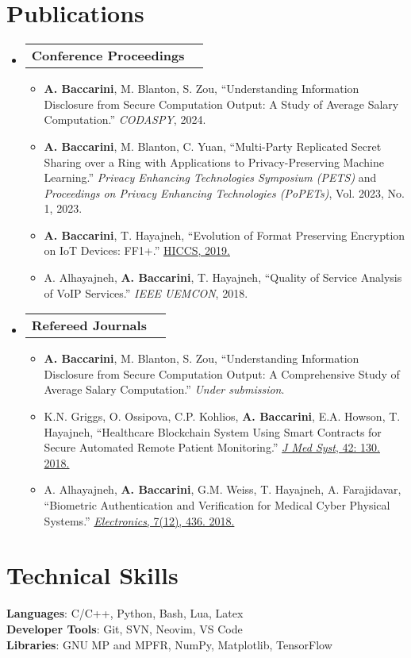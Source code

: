 \documentclass[letterpaper,11pt]{article}
\makeatletter
\newcommand{\resumeItem}[1]{
  \item\small{
    {#1 \vspace{-2pt}}
  }
}
\newcommand{\resumeProjectHeading}[2]{
    \item
    \begin{tabular*}{0.97\textwidth}{l@{\extracolsep{\fill}}r}
      \small#1 & #2 \\
    \end{tabular*}\vspace{-7pt}
}
\newcommand{\resumeSubHeadingListStart}{\begin{itemize}[leftmargin=0.15in, label={}]}
\newcommand{\resumeSubHeadingListEnd}{\end{itemize}}
\newcommand{\resumeItemListStart}{\begin{itemize}}
\newcommand{\resumeItemListEnd}{\end{itemize}\vspace{-5pt}}
\makeatother
\begin{document}
\section{Publications}
    \resumeSubHeadingListStart
      \resumeProjectHeading
          {\textbf{Conference Proceedings}}{}
          \resumeItemListStart
        \resumeItem{\textbf{A. Baccarini}, M. Blanton, S. Zou, ``Understanding Information Disclosure from Secure Computation Output: A Study of Average Salary Computation.'' \emph{CODASPY}, 2024.}
        \resumeItem{\textbf{A. Baccarini}, M. Blanton, C. Yuan, ``Multi-Party Replicated Secret Sharing over a Ring with Applications to Privacy-Preserving Machine Learning.'' \emph{Privacy Enhancing Technologies Symposium (PETS)} and \emph{Proceedings on Privacy Enhancing Technologies (PoPETs)}, Vol. 2023, No. 1, 2023. }
        \resumeItem{\textbf{A. Baccarini}, T. Hayajneh, ``Evolution of Format Preserving Encryption on IoT Devices: FF1+.'' \href{https://scholarspace.manoa.hawaii.edu/handle/10125/59603}{HICCS, 2019.}}
      \resumeItem{A. Alhayajneh, \textbf{A. Baccarini}, T. Hayajneh,  ``Quality of Service Analysis of VoIP Services.''  \emph{IEEE UEMCON}, 2018.}
          \resumeItemListEnd
      \resumeProjectHeading
          {\textbf{Refereed Journals}}{}
          \resumeItemListStart
        \resumeItem{\textbf{A. Baccarini}, M. Blanton, S. Zou,  ``Understanding Information Disclosure from Secure Computation Output: A Comprehensive Study of Average Salary Computation.''  \emph{Under submission}.}
        \resumeItem{K.N. Griggs, O. Ossipova, C.P. Kohlios, \textbf{A. Baccarini}, E.A. Howson, T. Hayajneh, ``Healthcare Blockchain System Using Smart Contracts for Secure Automated Remote Patient Monitoring.'' \href{https://link.springer.com/article/10.1007/s10916-018-0982-x}{\emph{J Med Syst}, 42: 130. 2018.} }
        \resumeItem{A. Alhayajneh, \textbf{A. Baccarini}, G.M. Weiss, T. Hayajneh, A.  Farajidavar,   ``Biometric Authentication and Verification for Medical Cyber Physical Systems.'' \href{https://www.mdpi.com/2079-9292/7/12/436}{\emph{Electronics}, 7(12), 436. 2018.}}
          \resumeItemListEnd
    \resumeSubHeadingListEnd




%
\section{Technical Skills}
 \begin{itemize}[leftmargin=0.15in, label={}]
    \small{\item{
     \textbf{Languages}{: C/C++, Python, Bash, Lua, Latex} \\
     \textbf{Developer Tools}{: Git, SVN, Neovim, VS Code } \\
     \textbf{Libraries}{:  GNU MP and MPFR, NumPy, Matplotlib, TensorFlow}
    }}
 \end{itemize}


\end{document}
